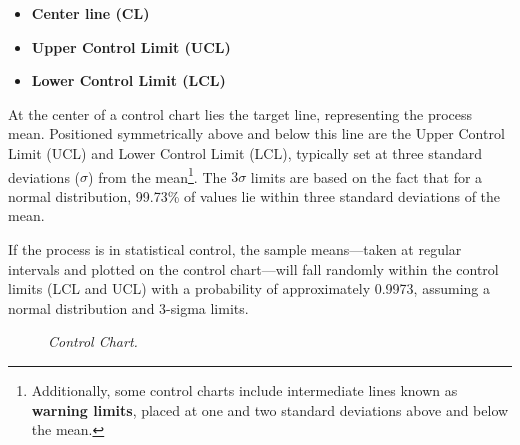 \documentclass[twoside]{book}
\begin{document}
\begin{itemize}
    \item \textbf{Center line (CL)}
    \item \textbf{Upper Control Limit (UCL)}
    \item \textbf{Lower Control Limit (LCL)}
\end{itemize}
At the center of a control chart lies the target line, representing the process mean. Positioned symmetrically above and below this line are the Upper Control Limit (UCL) and Lower Control Limit (LCL), typically set at three standard deviations ($\sigma$) from the mean\footnote{Additionally, some control charts include intermediate lines known as \textbf{warning limits}, placed at one and two standard deviations above and below the mean.}. The $3\sigma$ limits are based on the fact that for a normal distribution, 99.73\% of values lie within three standard deviations of the mean.

If the process is in statistical control, the sample means—taken at regular intervals and plotted on the control chart—will fall randomly within the control limits (LCL and UCL) with a probability of approximately 0.9973, assuming a normal distribution and 3-sigma limits.

\begin{figure}[H]
\centering
{}
\caption{\textit{Control Chart.}}
\end{figure}
\end{document}
